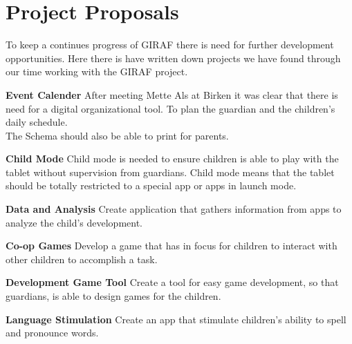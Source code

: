 \section{Project Proposals}
\label{chap:projectProposals}
To keep a continues progress of GIRAF there is need for further development opportunities. Here there is have written down projects we have found through our time working with the GIRAF project.   

\textbf{Event Calender} 
After meeting Mette Als at Birken it was clear that there is need for a digital organizational tool. To plan the guardian and the children's daily schedule.\\
The Schema should also be able to print for parents.     

\textbf{Child Mode}
Child mode is needed to ensure children is able to play with the tablet without supervision from guardians.
Child mode means that the tablet should be totally restricted to a special app or apps in launch mode.     

\textbf{Data and Analysis}
Create application that gathers information from apps to analyze the child’s development. 

\textbf{Co-op Games}
Develop a game that has in focus for children to interact with other children to accomplish a task.

\textbf{Development Game Tool}
Create a tool for easy game development, so that guardians, is able to design games for the children.

\textbf{Language Stimulation}
Create an app that stimulate children's ability to spell and pronounce words.       

